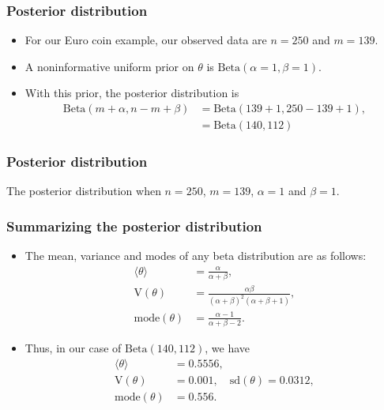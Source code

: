 \documentclass{slides}
\begin{document}
\begin{frame}
	\frametitle{Posterior distribution}
	\begin{itemize}
		\item For our Euro coin example, our observed data are $n=250$ and $m=139$.
		\item A noninformative uniform prior on $\theta$ is $\textrm{Beta}(\alpha=1,\beta=1)$.
		\item With this prior, the posterior distribution is 
			\begin{align*}
				\textrm{Beta}(m + \alpha, n - m + \beta) &= \textrm{Beta}(139 + 1, 250 - 139 + 1),\\
				&= \textrm{Beta}(140, 112)
			\end{align*}
	\end{itemize}
\end{frame}
\begin{frame}
	\frametitle{Posterior distribution}
	
	The posterior distribution when $n=250$, $m=139$, $\alpha=1$ and $\beta=1$.
\end{frame}

\begin{frame}
	\frametitle{Summarizing the posterior distribution}
	\begin{itemize}
		\item The mean, variance and modes of any beta distribution are as follows:
			\begin{align*}
				\langle \theta \rangle &=\frac{\alpha}{\alpha+\beta} ,\\
				\mathrm{V}(\theta) &= \frac{\alpha\beta}{(\alpha+\beta)^2(\alpha+\beta+1)},\\
				\textrm{mode}(\theta) &= \frac{\alpha-1}{\alpha+\beta-2}.
			\end{align*}
		\item Thus, in our case of $\textrm{Beta}(140, 112)$, we have
			\begin{align*}
				\langle \theta \rangle &=  0.5556,\\
				\mathrm{V}(\theta) &= 0.001, \quad\textrm{sd}(\theta) = 0.0312,\\
				\textrm{mode}(\theta) &= 0.556.
			\end{align*}

	\end{itemize}
\end{frame}
\end{document}
